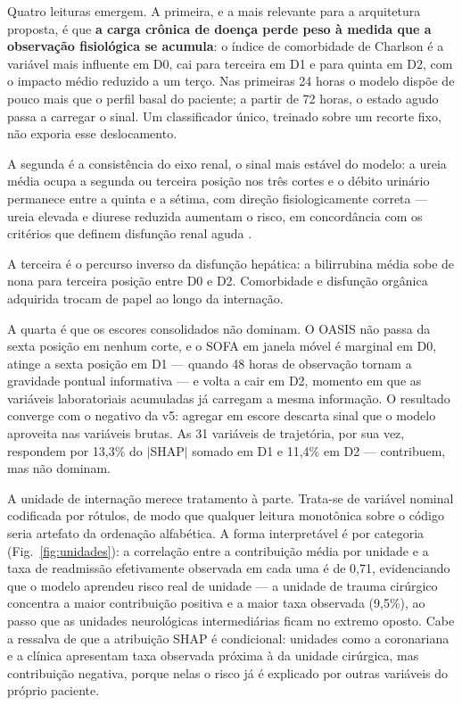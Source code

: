 \documentclass{ieeeaccess}
\begin{document}
Quatro leituras emergem. A primeira, e a mais relevante para a arquitetura proposta, é que \textbf{a carga crônica de doença perde peso à medida que a observação fisiológica se acumula}: o índice de comorbidade de Charlson \cite{Charlson1987} é a variável mais influente em D0, cai para terceira em D1 e para quinta em D2, com o impacto médio reduzido a um terço. Nas primeiras 24 horas o modelo dispõe de pouco mais que o perfil basal do paciente; a partir de 72 horas, o estado agudo passa a carregar o sinal. Um classificador único, treinado sobre um recorte fixo, não exporia esse deslocamento.

A segunda é a consistência do eixo renal, o sinal mais estável do modelo: a ureia média ocupa a segunda ou terceira posição nos três cortes e o débito urinário permanece entre a quinta e a sétima, com direção fisiologicamente correta --- ureia elevada e diurese reduzida aumentam o risco, em concordância com os critérios que definem disfunção renal aguda \cite{KDIGO2012}.

A terceira é o percurso inverso da disfunção hepática: a bilirrubina média sobe de nona para terceira posição entre D0 e D2. Comorbidade e disfunção orgânica adquirida trocam de papel ao longo da internação.

A quarta é que os escores consolidados não dominam. O OASIS \cite{JohnsonOASIS2013} não passa da sexta posição em nenhum corte, e o SOFA \cite{Vincent1996} em janela móvel é marginal em D0, atinge a sexta posição em D1 --- quando 48 horas de observação tornam a gravidade pontual informativa --- e volta a cair em D2, momento em que as variáveis laboratoriais acumuladas já carregam a mesma informação. O resultado converge com o negativo da v5: agregar em escore descarta sinal que o modelo aproveita nas variáveis brutas. As 31 variáveis de trajetória, por sua vez, respondem por 13,3\% do \(|\)SHAP\(|\) somado em D1 e 11,4\% em D2 --- contribuem, mas não dominam.

A unidade de internação merece tratamento à parte. Trata-se de variável nominal codificada por rótulos, de modo que qualquer leitura monotônica sobre o código seria artefato da ordenação alfabética. A forma interpretável é por categoria (Fig.~\ref{fig:unidades}): a correlação entre a contribuição média por unidade e a taxa de readmissão efetivamente observada em cada uma é de 0,71, evidenciando que o modelo aprendeu risco real de unidade --- a unidade de trauma cirúrgico concentra a maior contribuição positiva e a maior taxa observada (9,5\%), ao passo que as unidades neurológicas intermediárias ficam no extremo oposto. Cabe a ressalva de que a atribuição SHAP é condicional: unidades como a coronariana e a clínica apresentam taxa observada próxima à da unidade cirúrgica, mas contribuição negativa, porque nelas o risco já é explicado por outras variáveis do próprio paciente.
\end{document}
